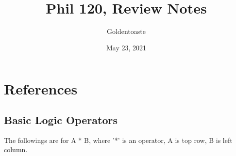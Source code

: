 \documentclass{article}
\title{Phil 120, Review Notes}
\author{Goldentoaste}
\date{May 23, 2021}
\begin{document}
\maketitle
\newpage
\tableofcontents{}

\newpage    

\newcommand{\true}{{\mathfrak{t}}}
\newcommand{\false}{{\mathfrak{f}}}
\newcommand{\greencell}{\cellcolor{green!45}T}
\newcommand{\redcell}{\cellcolor{red!45}F}
\newcommand{\orangecell}{\cellcolor{orange!45}B}
\newcommand{\E}{\mathbb{E}}
\section{References}

\subsection{Basic Logic Operators}
The followings are for A * B, where '*' is an operator, A is top row, B is left column.
\end{document}
